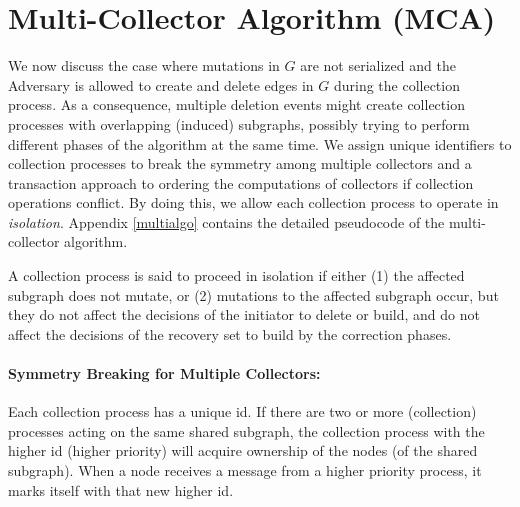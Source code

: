 \section{Multi-Collector Algorithm (MCA)}
\label{multi}
We now discuss the case where mutations in $G$ are not serialized and the Adversary is allowed to create and delete edges in $G$ during the collection process.
As a consequence, multiple deletion events might create collection processes
with overlapping (induced) subgraphs, possibly trying to perform different phases of the
algorithm at the same time. 
We assign unique identifiers to collection processes to break the symmetry among multiple collectors and a transaction approach to ordering the computations of collectors if collection operations conflict. By doing this, we allow each collection process to operate in \emph{isolation}.
Appendix \ref{multialgo} contains the detailed pseudocode of the multi-collector algorithm. 

\begin{definition}[Isolation]
A collection process is said to proceed in isolation if either (1) the affected subgraph does not mutate, or (2) mutations to the affected subgraph occur, but they do not affect the decisions of the initiator to delete or build, and do not affect the decisions of the recovery set to build by the correction phases.
\end{definition}



\paragraph{Symmetry Breaking for Multiple Collectors:}
Each collection process has a unique id. If there are two or more (collection) processes acting on the same shared
subgraph, the collection process with the higher id (higher priority) will
acquire ownership of the nodes (of the shared subgraph).
When a node receives a message from a higher priority process, it marks itself
with that new higher id.


